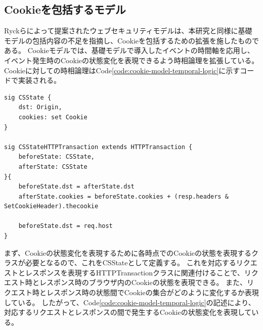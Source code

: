\documentclass[journal]{IEEEtran}
\begin{document}
\subsection{Cookieを包括するモデル}
\label{sec:cookie-model}
Ryckらによって提案されたウェブセキュリティモデル\cite{cookie-model}は、本研究と同様に基礎モデルの包括内容の不足を指摘し、Cookieを包括するための拡張を施したものである。
Cookieモデルでは、基礎モデルで導入したイベントの時間軸を応用し、イベント発生時のCookieの状態変化を表現できるよう時相論理を拡張している。
Cookieに対しての時相論理はCode\ref{code:cookie-model-temporal-logic}に示すコードで実装される。
\begin{lstlisting}[caption=Cookieに対する時相論理, label=code:cookie-model-temporal-logic]
sig CSState {
	dst: Origin,
	cookies: set Cookie
}

sig CSStateHTTPTransaction extends HTTPTransaction {
	beforeState: CSState,
	afterState: CSState
}{
	beforeState.dst = afterState.dst
	afterState.cookies = beforeState.cookies + (resp.headers & SetCookieHeader).thecookie
	
	beforeState.dst = req.host
}
\end{lstlisting}
まず、Cookieの状態変化を表現するために各時点でのCookieの状態を表現するクラスが必要となるので、これをCSStateとして定義する。
これを対応するリクエストとレスポンスを表現するHTTPTransactionクラスに関連付けることで、リクエスト時とレスポンス時のブラウザ内のCookieの状態を表現できる。
また、リクエスト時とレスポンス時の状態間でCookieの集合がどのように変化するか表現している。
したがって、Code\ref{code:cookie-model-temporal-logic}の記述により、対応するリクエストとレスポンスの間で発生するCookieの状態変化を表現している。
\end{document}
